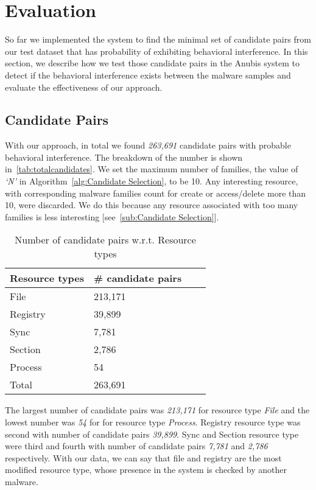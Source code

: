 \chapter{Evaluation}
\label{chapter:evaluation}
So far we implemented the system to find the minimal set of candidate pairs from our test dataset that has probability of exhibiting behavioral interference.
In this section, we describe how we test those candidate pairs in the Anubis system to detect if the behavioral interference exists between the malware samples and evaluate the effectiveness of our approach.
\section{Candidate Pairs}
\label{sec:Candidate Pairs}
With our approach, in total we found \emph{263,691} candidate pairs with probable behavioral interference.
The breakdown of the number is shown in~\autoref{tab:totalcandidates}.
We set the maximum number of families, the value of \emph{`N'} in Algorithm~\autoref{alg:Candidate Selection}, to be 10.
Any interesting resource, with corresponding malware families count for create or access/delete more than 10, were discarded.
We do this because any resource associated with too many families is less interesting [see~\autoref{sub:Candidate Selection}].

\begin{table}[ht]
  \caption[Number of probable candidate pairs w.r.t. Resource types]{Number of candidate pairs w.r.t. Resource types}\label{tab:totalcandidates}
  \centering
  \begin{tabular}{l l l l}
    \toprule
    Resource types & \# candidate pairs\\
    \midrule
    File & 213,171 \\
    Registry & 39,899 \\
    Sync & 7,781 \\
    Section & 2,786 \\
    Process & 54\\
    \bottomrule
    Total & 263,691\\
  \end{tabular}
\end{table}
The largest number of candidate pairs was \emph{213,171} for resource type \emph{File} and the lowest number was \emph{54} for for resource type \emph{Process}.
Registry resource type was second with number of candidate pairs \emph{39,899}.
Sync and Section resource type were third and fourth with number of candidate pairs \emph{7,781} and \emph{2,786} respectively.
With our data, we can say that file and registry are the most modified resource type, whose presence in the system is checked by another malware.\\


